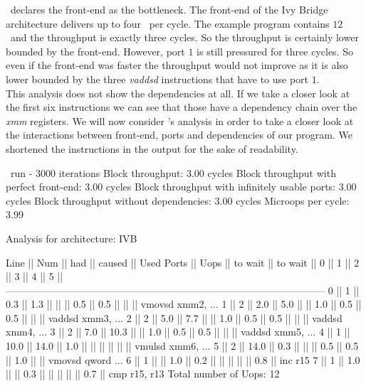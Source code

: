 \iaca\ declares the front-end as the bottleneck. The front-end of the Ivy Bridge architecture delivers up to four \microops\ per cycle. The example program contains $12$ \microops\ and the throughput is exactly three cycles. So the throughput is certainly lower bounded by the front-end. However, port $1$ is still pressured for three cycles. So even if the front-end was faster the throughput would not improve as it is also lower bounded by the three \emph{vaddsd} instructions that have to use port $1$.\\
This analysis does not show the dependencies at all. If we take a closer look at the first six instructions we can see that those have a dependency chain over the \emph{xmm} registers. We will now consider \suaca's analysis in order to take a closer look at the interactions between front-end, ports and dependencies of our program. We shortened the instructions in the output for the sake of readability.

\begin{LabeledExample}{\suaca\ run - $3000$ iterations}{\label{ex:suaca3000}}
    Block throughput: 3.00 cycles
    Block throughput with perfect front-end: 3.00 cycles
    Block throughput with infinitely usable ports: 3.00 cycles
    Block throughput without dependencies: 3.00 cycles
    Microops per cycle: 3.99
    
    Analysis for architecture: IVB
    
     Line  ||   Num   ||   had   || caused  ||            Used Ports
           ||   Uops  || to wait || to wait ||   0   ||   1   ||   2   ||   3   ||   4   ||   5   ||
     ------------------------------------------------------------------------------------------------
       0   ||    1    ||   0.3   ||   1.3   ||       ||       ||  0.5  ||  0.5  ||       ||       || vmovsd xmm2, ...
       1   ||    2    ||   2.0   ||   5.0   ||       ||  1.0  ||  0.5  ||  0.5  ||       ||       || vaddsd xmm3, ...
       2   ||    2    ||   5.0   ||   7.7   ||       ||  1.0  ||  0.5  ||  0.5  ||       ||       || vaddsd xmm4, ...
       3   ||    2    ||   7.0   ||  10.3   ||       ||  1.0  ||  0.5  ||  0.5  ||       ||       || vaddsd xmm5, ...
       4   ||    1    ||  10.0   ||  14.0   ||  1.0  ||       ||       ||       ||       ||       || vmulsd xmm6, ...
       5   ||    2    ||  14.0   ||   0.3   ||       ||       ||  0.5  ||  0.5  ||  1.0  ||       || vmovsd qword ...
       6   ||    1    ||         ||   1.0   ||  0.2  ||       ||       ||       ||       ||  0.8  || inc r15
       7   ||    1    ||   1.0   ||         ||  0.3  ||       ||       ||       ||       ||  0.7  || cmp r15, r13
    Total number of Uops: 12
\end{LabeledExample}  

